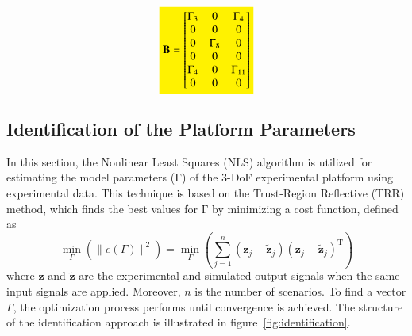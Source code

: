 \documentclass[3p]{elsarticle}
\begin{document}
\begin{align}
    \colorbox{yellow}{$
    \boldsymbol{\mathrm{B}} = 
     \begin{bmatrix}
        \Gamma_3 & 0 & \Gamma_4\\
        0 & 0 & 0 \\
        0 & \Gamma_8 & 0 \\
        0 & 0 & 0 \\
        \Gamma_4 & 0 & \Gamma_{11} \\
        0 & 0 & 0
    \end{bmatrix}
$}
\end{align}
\subsection{Identification of the Platform Parameters}
\noindent In this section, the Nonlinear Least Squares (NLS) algorithm is utilized for estimating the model parameters ($\boldsymbol{\mathrm{\Gamma}}$) of the 3-DoF experimental platform using experimental data.
This technique is based on the Trust-Region Reflective (TRR) method, which finds the best values for $\boldsymbol{\mathrm{\Gamma}}$ by minimizing a cost function, defined as
\begin{equation}
    \min_{\Gamma}\left(\parallel e(\Gamma) \parallel^2\right) = 
    \min_{\Gamma} \left(\sum_{j=1}^{n}(\boldsymbol{z}_j- \tilde{\boldsymbol{z}}_j)(\boldsymbol{z}_j- \tilde{\boldsymbol{z}}_j)^\mathrm{T}\right)
\end{equation} %
where $\boldsymbol{z}$ and $\tilde{\boldsymbol{z}}$ are the experimental and simulated output signals when the same input signals are applied.
Moreover, $n$ is the number of scenarios.
To find a vector $\Gamma$, the optimization process performs until convergence is achieved. %
The structure of the identification approach is illustrated in figure~\ref{fig:identification}.
\end{document}
